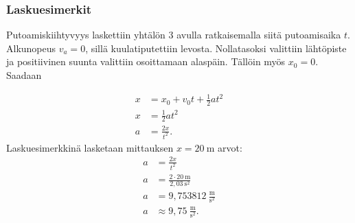 \documentclass[a4paper,12pt]{article}
\begin{document}






\subsubsection{Laskuesimerkit}



Putoamiskiihtyvyys laskettiin yhtälön 3 avulla ratkaisemalla siitä putoamisaika $t$. Alkunopeus $v_a = 0$, sillä kuulatiputettiin levosta. Nollatasoksi valittiin lähtöpiste ja positiivinen suunta valittiin osoittamaan alaspäin. Tällöin myös $x_{0} = 0$. Saadaan
 
\begin{align*} %
x &= x_{0} + v_{0} t + \frac{1}{2} a t^{2} \\
x &= \frac{1}{2} a t^{2} \\
a &= \frac{2 x}{t^{2}}.
\end{align*}
Laskuesimerkkinä lasketaan mittauksen $x=20~\mathrm{m}$ arvot:
\begin{align*}
a &= \frac{2 x}{t^{2}} \\
a &= \frac{2 \cdot 20~\mathrm{m} }{2,03~\mathrm{s}^{2}} \\ %
a &= 9,753812~\frac{\mathrm{m}}{\mathrm{s}^{2}} \\
a & \approx 9,75~\frac{\mathrm{m}}{\mathrm{s}^{2}}.
\end{align*}
\end{document}
